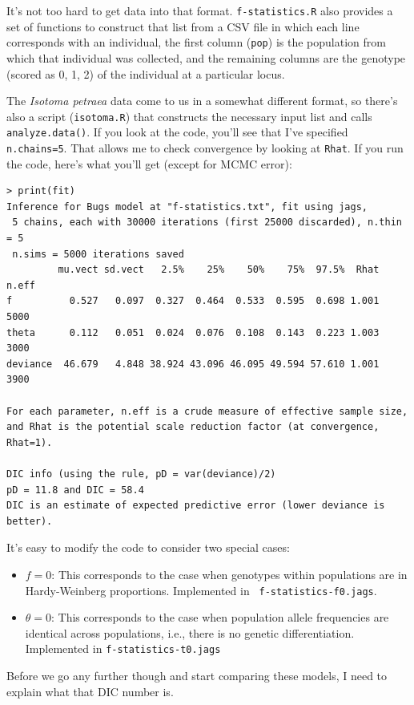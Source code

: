 It's not too hard to get data into that format. {\tt f-statistics.R}
also provides a set of functions to construct that list from a CSV
file in which each line corresponds with an individual, the first
column ({\tt pop}) is the population from which that individual was
collected, and the remaining columns are the genotype (scored as 0, 1,
2) of the individual at a particular locus.

The {\it Isotoma petraea\/} data come to us in a somewhat different
format, so there's also a script ({\tt isotoma.R}) that constructs the
necessary input list and calls {\tt analyze.data()}. If you look at
the code, you'll see that I've specified {\tt n.chains=5}. That allows
me to check convergence by looking at {\tt Rhat}. If you run the code,
here's what you'll get (except for MCMC error):
\begin{verbatim}
> print(fit)
Inference for Bugs model at "f-statistics.txt", fit using jags,
 5 chains, each with 30000 iterations (first 25000 discarded), n.thin = 5
 n.sims = 5000 iterations saved
         mu.vect sd.vect   2.5%    25%    50%    75%  97.5%  Rhat n.eff
f          0.527   0.097  0.327  0.464  0.533  0.595  0.698 1.001  5000
theta      0.112   0.051  0.024  0.076  0.108  0.143  0.223 1.003  3000
deviance  46.679   4.848 38.924 43.096 46.095 49.594 57.610 1.001  3900

For each parameter, n.eff is a crude measure of effective sample size,
and Rhat is the potential scale reduction factor (at convergence, Rhat=1).

DIC info (using the rule, pD = var(deviance)/2)
pD = 11.8 and DIC = 58.4
DIC is an estimate of expected predictive error (lower deviance is better).
\end{verbatim}

It's easy to modify the code to consider two special cases:

\begin{itemize}

\item $f=0$: This corresponds to the case when genotypes within
  populations are in Hardy-Weinberg proportions. Implemented in {\tt
    f-statistics-f0.jags}.

\item $\theta=0$: This corresponds to the case when population allele
  frequencies are identical across populations, i.e., there is no
  genetic differentiation. Implemented in {\tt f-statistics-t0.jags}

\end{itemize}
Before we go any further though and start comparing these models,
I need to explain what that DIC number is.

